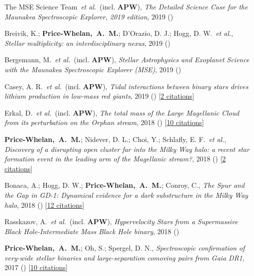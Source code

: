 \item[{\color{deemph}\scriptsize9}]The MSE Science Team~\textit{et al.}~(incl. \textbf{APW}), \textit{The Detailed Science Case for the Maunakea Spectroscopic Explorer, 2019 edition}, 2019 ()

\item[{\color{deemph}\scriptsize8}]Breivik, K.; \textbf{Price-Whelan,~A.~M.}; D'Orazio, D. J.; Hogg, D. W.~\textit{et al.}, \textit{Stellar multiplicity: an interdisciplinary nexus}, 2019 ()

\item[{\color{deemph}\scriptsize7}]Bergemann, M.~\textit{et al.}~(incl. \textbf{APW}), \textit{Stellar Astrophysics and Exoplanet Science with the Maunakea Spectroscopic Explorer (MSE)}, 2019 ()

\item[{\color{deemph}\scriptsize6}]Casey, A. R.~\textit{et al.}~(incl. \textbf{APW}), \textit{Tidal interactions between binary stars drives lithium production in low-mass red giants}, 2019 () [\href{http://adsabs.harvard.edu/abs/2019arXiv190204102C}{2 citations}]

\item[{\color{deemph}\scriptsize5}]Erkal, D.~\textit{et al.}~(incl. \textbf{APW}), \textit{The total mass of the Large Magellanic Cloud from its perturbation on the Orphan stream}, 2018 () [\href{http://adsabs.harvard.edu/abs/2018arXiv181208192E}{10 citations}]

\item[{\color{deemph}\scriptsize4}]\textbf{Price-Whelan,~A.~M.}; Nidever, D. L.; Choi, Y.; Schlafly, E. F.~\textit{et al.}, \textit{Discovery of a disrupting open cluster far into the Milky Way halo: a recent star formation event in the leading arm of the Magellanic stream?}, 2018 () [\href{http://adsabs.harvard.edu/abs/2018arXiv181105991P}{2 citations}]

\item[{\color{deemph}\scriptsize3}]Bonaca, A.; Hogg, D. W.; \textbf{Price-Whelan,~A.~M.}; Conroy, C., \textit{The Spur and the Gap in GD-1: Dynamical evidence for a dark substructure in the Milky Way halo}, 2018 () [\href{http://adsabs.harvard.edu/abs/2018arXiv181103631B}{12 citations}]

\item[{\color{deemph}\scriptsize2}]Rasskazov, A.~\textit{et al.}~(incl. \textbf{APW}), \textit{Hypervelocity Stars from a Supermassive Black Hole-Intermediate Mass Black Hole binary}, 2018 ()

\item[{\color{deemph}\scriptsize1}]\textbf{Price-Whelan,~A.~M.}; Oh, S.; Spergel, D. N., \textit{Spectroscopic confirmation of very-wide stellar binaries and large-separation comoving pairs from Gaia DR1}, 2017 () [\href{http://adsabs.harvard.edu/abs/2017arXiv170903532P}{10 citations}]
